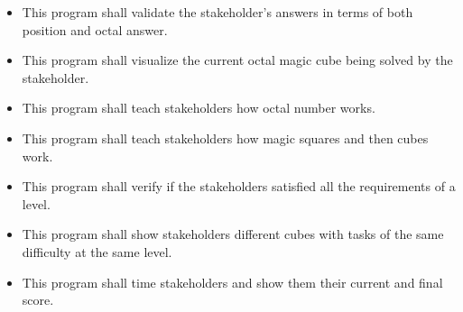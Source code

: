 \documentclass[12pt]{article}
\newcounter{srnum} %
\begin{document}
\noindent \begin{itemize}




\item[SR\refstepcounter{srnum}\thesrnum \label{MagicCubeValidator}] This program shall validate the stakeholder's answers in terms of both position and octal answer.

\item[SR\refstepcounter{srnum}\thesrnum \label{CubeVisualizer}] This program shall visualize the current octal magic cube being solved by the stakeholder.

\item[SR\refstepcounter{srnum}\thesrnum \label{OctalExplainer}] This program shall teach stakeholders how octal number works.

\item[SR\refstepcounter{srnum}\thesrnum \label{MagicCubeExplainer}] This program shall teach stakeholders how magic squares and then cubes work.

\item[SR\refstepcounter{srnum}\thesrnum \label{CompletionVerifier}] This program shall verify if the stakeholders satisfied all the requirements of a level.

\item[SR\refstepcounter{srnum}\thesrnum \label{LevelGenerator}] This program shall show stakeholders different cubes with tasks of the same difficulty at the same level.

\item[SR\refstepcounter{srnum}\thesrnum \label{ScoreKeeper}] This program shall time stakeholders and show them their current and final score.


\end{itemize}
\end{document}
